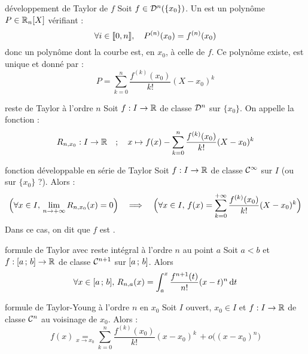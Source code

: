 

\begin{adjustwidth}{-3cm}{-3cm}


\begin{definition}{25.13}{développement de Taylor de $f$}
Soit $f \in \mathcal{D}^{n}(\{x_0\})$. Un  est un polynôme $P \in \mathbb{R}_n[X]$ vérifiant :
$$ \forall i \in \llbracket 0,n \rrbracket, \quad P^{(n)}(x_0) = f^{(n)}(x_0) $$
donc un polynôme dont la courbe est, en $x_0$,  à celle de $f$. Ce polynôme existe, est unique et donné par : 
$$P = \sum_{k=0}^{n}\frac{f^{(k)}(x_0)}{k!}(X-x_0)^k$$
\end{definition}

\begin{definition}{25.16}{reste de Taylor à l'ordre $n$}
    Soit $f:I \to \mathbb{R}$ de classe $\mathcal{D}^{n}$ sur $\{x_0\}$. On appelle  la fonction : 
    $$R_{n,x_0} : I \to \mathbb{R} \quad ; \quad x \mapsto f(x) - \sum_{k=0}^{n}\frac{f^{(k)}(x_0)}{k!}(X-x_0)^k$$
\end{definition}

\begin{proposition}{25.18}{fonction développable en série de Taylor}
    Soit $f:I \to \mathbb{R}$ de classe $\mathcal{C}^{\infty}$ sur $I$ (ou sur $\{x_0\}$ ?). Alors : 
    $$\Bigr(\forall x \in I, \, \lim_{n \to +\infty} R_{n,x_0}(x) = 0\Bigl) \quad \implies \quad \Bigr(\forall x \in I, \, f(x) = \sum_{k=0}^{+\infty}\frac{f^{(k)}(x_0)}{k!}(X-x_0)^k\Bigl)$$
    Dans ce cas, on dit que $f$ est .
\end{proposition}

\begin{theoreme}{25.20}{formule de Taylor avec reste intégral à l'ordre $n$ au point $a$}
    Soit $a<b$ et $f:[a\, ; \, b] \to \mathbb{R}$ de classe $\mathcal{C}^{n+1}$ sur $[a\, ; \, b]$. Alors
    $$\forall x \in [a\, ; \, b],\, R_{n,a}(x) = \int_{a}^{x} \frac{f^{n+1}(t)}{n!}(x-t)^n\, \text{d}t $$

\end{theoreme}

\begin{theoreme}{25.27}{formule de Taylor-Young à l'ordre $n$ en $x_0$}
    Soit $I$ ouvert, $x_0 \in I$ et $f:I \to \mathbb{R}$ de classe $\mathcal{C}^{n}$ au voisinage de $x_0$. Alors : 
    $$f(x) \underset{x \to x_0}{=} \sum_{k=0}^{n}\frac{f^{(k)}(x_0)}{k!}(x-x_0)^k \, + o\bigl((x-x_0)^n\bigr)$$
\end{theoreme}


\end{adjustwidth}

